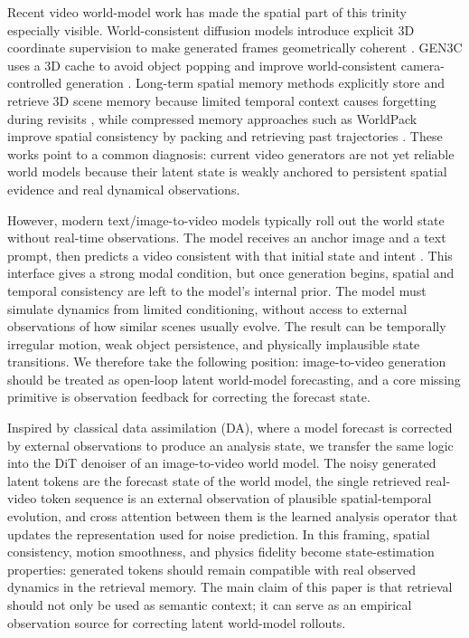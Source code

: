 \documentclass{article}
\begin{document}
Recent video world-model work has made the spatial part of this trinity especially visible. World-consistent diffusion models introduce explicit 3D coordinate supervision to make generated frames geometrically coherent \citep{worldconsistentdiffusion2024}. GEN3C uses a 3D cache to avoid object popping and improve world-consistent camera-controlled generation \citep{gen3c2025}. Long-term spatial memory methods explicitly store and retrieve 3D scene memory because limited temporal context causes forgetting during revisits \citep{spatialmemory2025}, while compressed memory approaches such as WorldPack improve spatial consistency by packing and retrieving past trajectories \citep{worldpack2025}. These works point to a common diagnosis: current video generators are not yet reliable world models because their latent state is weakly anchored to persistent spatial evidence and real dynamical observations.

However, modern text/image-to-video models typically roll out the world state without real-time observations. The model receives an anchor image and a text prompt, then predicts a video consistent with that initial state and intent \citep{wan2025}. This interface gives a strong modal condition, but once generation begins, spatial and temporal consistency are left to the model's internal prior. The model must simulate dynamics from limited conditioning, without access to external observations of how similar scenes usually evolve. The result can be temporally irregular motion, weak object persistence, and physically implausible state transitions. We therefore take the following position: image-to-video generation should be treated as open-loop latent world-model forecasting, and a core missing primitive is observation feedback for correcting the forecast state.

Inspired by classical data assimilation (DA), where a model forecast is corrected by external observations to produce an analysis state, we transfer the same logic into the DiT denoiser of an image-to-video world model. The noisy generated latent tokens are the forecast state of the world model, the single retrieved real-video token sequence is an external observation of plausible spatial-temporal evolution, and cross attention between them is the learned analysis operator that updates the representation used for noise prediction. In this framing, spatial consistency, motion smoothness, and physics fidelity become state-estimation properties: generated tokens should remain compatible with real observed dynamics in the retrieval memory. The main claim of this paper is that retrieval should not only be used as semantic context; it can serve as an empirical observation source for correcting latent world-model rollouts.
\end{document}
